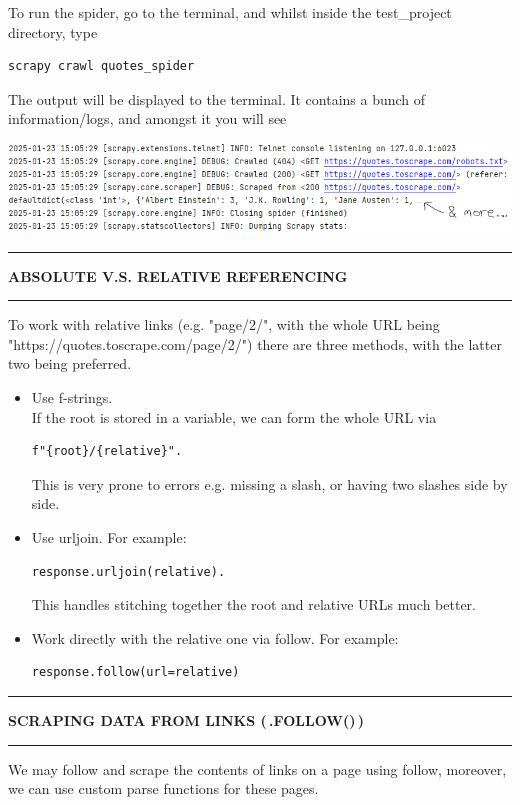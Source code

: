 \documentclass[8pt]{extarticle}
\newcommand{\heading}[1]{%
    \noindent
    \rule{\linewidth}{0.4pt}
    \begin{center}
        \vspace{-1ex}
        \textbf{#1}        
        \vspace{-2.5ex}
    \end{center}
    \rule{\linewidth}{0.4pt}
}
\begin{document}
\begin{multicols}{3}
To run the spider, go to the terminal, and whilst inside the test\_project directory, type

\begin{lstlisting}[style=python]     
    scrapy crawl quotes_spider
\end{lstlisting}

The output will be displayed to the terminal. It contains a bunch of information/logs, and amongst it you will see 

\begin{center}
    \includegraphics[width=\columnwidth]{images/scrapy_output_eg.png}
\end{center}

\heading{ABSOLUTE V.S. RELATIVE REFERENCING}

To work with relative links (e.g. "page/2/", with the whole URL being "https://quotes.toscrape.com/page/2/") there are three methods, with the latter two being preferred.

\begin{itemize}
    \item Use f-strings. \\
    If the root is stored in a variable, we can form the whole URL via 
    \begin{lstlisting}[style=python]     
    f"{root}/{relative}".
    \end{lstlisting}
    This is very prone to errors e.g. missing a slash, or having two slashes side by side.
    \item Use urljoin. For example:     
    \begin{lstlisting}[style=python]     
    response.urljoin(relative).
    \end{lstlisting}
    This handles stitching together the root and relative URLs much better.
    \item Work directly with the relative one via follow. For example: 
    \begin{lstlisting}[style=python] 
    response.follow(url=relative)
    \end{lstlisting}
\end{itemize}

\heading{SCRAPING DATA FROM LINKS (\,.FOLLOW()\,)}

We may follow and scrape the contents of links on a page using follow, moreover, we can use custom parse functions for these pages.\\


\end{multicols}
\end{document}
